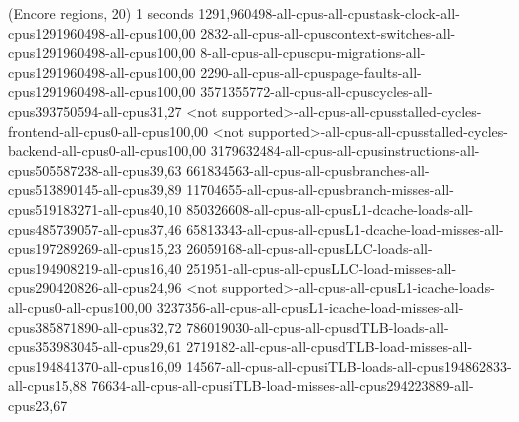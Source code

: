 (Encore regions, 20)
1 seconds
1291,960498-all-cpus-all-cpustask-clock-all-cpus1291960498-all-cpus100,00
2832-all-cpus-all-cpuscontext-switches-all-cpus1291960498-all-cpus100,00
8-all-cpus-all-cpuscpu-migrations-all-cpus1291960498-all-cpus100,00
2290-all-cpus-all-cpuspage-faults-all-cpus1291960498-all-cpus100,00
3571355772-all-cpus-all-cpuscycles-all-cpus393750594-all-cpus31,27
<not supported>-all-cpus-all-cpusstalled-cycles-frontend-all-cpus0-all-cpus100,00
<not supported>-all-cpus-all-cpusstalled-cycles-backend-all-cpus0-all-cpus100,00
3179632484-all-cpus-all-cpusinstructions-all-cpus505587238-all-cpus39,63
661834563-all-cpus-all-cpusbranches-all-cpus513890145-all-cpus39,89
11704655-all-cpus-all-cpusbranch-misses-all-cpus519183271-all-cpus40,10
850326608-all-cpus-all-cpusL1-dcache-loads-all-cpus485739057-all-cpus37,46
65813343-all-cpus-all-cpusL1-dcache-load-misses-all-cpus197289269-all-cpus15,23
26059168-all-cpus-all-cpusLLC-loads-all-cpus194908219-all-cpus16,40
251951-all-cpus-all-cpusLLC-load-misses-all-cpus290420826-all-cpus24,96
<not supported>-all-cpus-all-cpusL1-icache-loads-all-cpus0-all-cpus100,00
3237356-all-cpus-all-cpusL1-icache-load-misses-all-cpus385871890-all-cpus32,72
786019030-all-cpus-all-cpusdTLB-loads-all-cpus353983045-all-cpus29,61
2719182-all-cpus-all-cpusdTLB-load-misses-all-cpus194841370-all-cpus16,09
14567-all-cpus-all-cpusiTLB-loads-all-cpus194862833-all-cpus15,88
76634-all-cpus-all-cpusiTLB-load-misses-all-cpus294223889-all-cpus23,67
